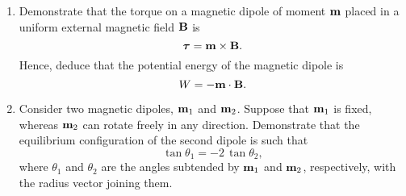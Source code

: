{\begin{enumerate}
\item Demonstrate that the torque on a magnetic dipole  of moment ${\bf m}$ placed in a uniform
external magnetic field ${\bf B}$ is
$$
\mbox{\boldmath$\tau$} = {\bf m}\times {\bf B}.
$$
Hence, deduce that the potential energy of the magnetic dipole is
$$
W = - {\bf m}\cdot{\bf B}.
$$
\item Consider two magnetic dipoles, ${\bf m}_1$ and ${\bf m}_2$. Suppose
that ${\bf m}_1$ is fixed, whereas ${\bf m}_2$ can rotate freely in any direction. Demonstrate that the equilibrium configuration of the second dipole is
such that
$$
\tan\theta_1 = - 2\,\tan\theta_2,
$$
where $\theta_1$ and $\theta_2$ are the angles subtended by ${\bf m}_1$
and ${\bf m}_2$, respectively, with the radius vector joining them.
\end{enumerate}
\renewcommand{\theenumi}{2.\arabic{enumi}}
}
